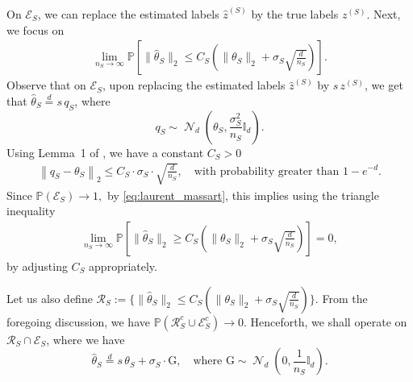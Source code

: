 \documentclass[10pt]{article}
\newcommand{\Id}{\mathbb I}
\newcommand{\wh}{\widehat}
\DeclareMathOperator{\dnorm}{\mathcal N}
\newcommand{\src}{S}
\newcommand{\thetaS}{\theta_{\src}}
\newcommand{\nS}{n_{\src}}
\newcommand{\sigmaS}{\sigma_{\src}}
\newcommand{\zsrc}{z^{(\src)}}
\begin{document}
On $\mathcal E_\src$, we can replace the estimated labels $\wh z^{(\src)}$ by the true labels $\zsrc$. Next, we focus on
\begin{align}
    \lim_{\nS \rightarrow \infty}\mathbb P\left[\|\wh \theta_\src\|_2 \le C_\src\left(\|\theta_\src\|_2+\sigmaS\sqrt{\frac{d}{\nS}}\right)\right].
\end{align}
Observe that on $\mathcal E_\src$, upon replacing the estimated labels $\wh z^{(\src)}$ by $s\,\zsrc$, we get that $\wh \theta_\src \overset{d}{=} s\,q_\src$, where
\[
q_\src \sim \dnorm_d\left(\theta_\src,\frac{\sigmaS^2}{\nS}\Id_d\right).
\]
Using Lemma~1 of \cite{laurent2000adaptive}, we have a constant $C_\src>0$
\begin{align}
\label{eq:laurent_massart}
    \left\|q_\src-\theta_\src\right\|_2  \le C_\src\cdot\sigmaS\cdot\sqrt{\frac{d}{\nS}}, \quad \mbox{with probability greater than $1-e^{-d}$.}
\end{align}
Since $\mathbb P(\mathcal E_\src) \to 1,$ by \eqref{eq:laurent_massart}, this implies using the triangle inequality
\begin{align}
    \lim_{\nS \rightarrow \infty}\mathbb P\left[\|\wh \theta_\src\|_2 \ge C_\src\left(\|\theta_\src\|_2+\sigmaS\sqrt{\frac{d}{\nS}}\right)\right]=0,
\end{align}
by adjusting $C_\src$ appropriately.

Let us also define $\mathcal R_\src:=\{\|\wh \theta_\src\|_2 \le C_\src\left(\|\theta_\src\|_2+\sigmaS\sqrt{\frac{d}{\nS}}\right)\}$. From the foregoing discussion, we have
$\mathbb P(\mathcal R^c_\src \cup \mathcal E^c_\src) \to 0$.
Henceforth, we shall operate on $\mathcal R_\src \cap \mathcal E_\src$, where we have
\[
\wh \theta_\src \overset{d}{=} s\,\thetaS+\sigmaS \cdot \mathrm{G}, \quad \mbox{where $\mathrm{G} \sim \dnorm_d(0,\frac{1}{\nS}\Id_d)$.}
\]
\end{document}
